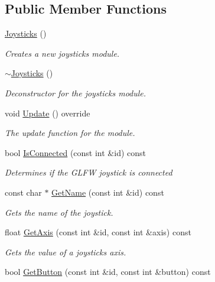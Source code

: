 \subsection*{Public Member Functions}
\begin{DoxyCompactItemize}
\item 
\hyperlink{class_flounder_1_1_joysticks_a4465b7247fd550ea28974cf0d26a6ffa}{Joysticks} ()
\begin{DoxyCompactList}\small\item\em Creates a new joysticks module. \end{DoxyCompactList}\item 
\hyperlink{class_flounder_1_1_joysticks_a819718520fdb729b58f1db3bd698016a}{$\sim$\+Joysticks} ()
\begin{DoxyCompactList}\small\item\em Deconstructor for the joysticks module. \end{DoxyCompactList}\item 
void \hyperlink{class_flounder_1_1_joysticks_ae36e2d9f8c8736fc6c22dde0e58f2d4d}{Update} () override
\begin{DoxyCompactList}\small\item\em The update function for the module. \end{DoxyCompactList}\item 
bool \hyperlink{class_flounder_1_1_joysticks_abd63db24c4dcdc3440cf35a52b866d8e}{Is\+Connected} (const int \&id) const
\begin{DoxyCompactList}\small\item\em Determines if the G\+L\+FW joystick is connected \end{DoxyCompactList}\item 
const char $\ast$ \hyperlink{class_flounder_1_1_joysticks_a06c2c2521ce46921a679c78b9d170072}{Get\+Name} (const int \&id) const
\begin{DoxyCompactList}\small\item\em Gets the name of the joystick. \end{DoxyCompactList}\item 
float \hyperlink{class_flounder_1_1_joysticks_a2bd889734e023551f79125c138830236}{Get\+Axis} (const int \&id, const int \&axis) const
\begin{DoxyCompactList}\small\item\em Gets the value of a joysticks axis. \end{DoxyCompactList}\item 
bool \hyperlink{class_flounder_1_1_joysticks_a22824221cb88733feec994c875c09a30}{Get\+Button} (const int \&id, const int \&button) const

\end{DoxyCompactItemize}
